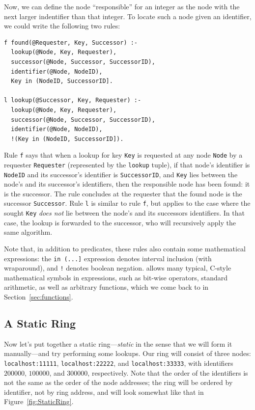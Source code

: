 \documentclass{article}
\begin{document}
Now, we can define the node ``responsible'' for an integer as the node
with the next larger indentifier than that integer.  To locate such a
node given an identifier, we could write the following two rules:
\begin{lstlisting}
f found(@Requester, Key, Successor) :-
  lookup(@Node, Key, Requester),
  successor(@Node, Successor, SuccessorID),
  identifier(@Node, NodeID),
  Key in (NodeID, SuccessorID].

l lookup(@Successor, Key, Requester) :-
  lookup(@Node, Key, Requester),
  successor(@Node, Successor, SuccessorID),
  identifier(@Node, NodeID),
  !(Key in (NodeID, SuccessorID]).
\end{lstlisting}
Rule \lstinline$f$ says that when a lookup for key \lstinline$Key$ is
requested at any node \lstinline$Node$ by a requester
\lstinline$Requester$ (represented by the \lstinline$lookup$ tuple), if
that node's identifier is \lstinline$NodeID$ and its successor's
identifier is \lstinline$SuccessorID$, and \lstinline$Key$ lies between
the node's and its successor's identifiers, then the responsible node
has been found: it is the successor. The rule concludes at the requester
that the found node is the successor \lstinline$Successor$.  Rule
\lstinline$l$ is similar to rule \lstinline$f$, but applies to the case
where the sought \lstinline$Key$ \emph{does not} lie between the node's
and its successors identifiers. In that case, the lookup is forwarded to
the successor, who will recursively apply the same algorithm.

Note that, in addition to predicates, these rules also contain some
mathematical expressions: the \lstinline$in (...]$ expression denotes
interval inclusion (with wraparound), and \lstinline$!$ denotes boolean
negation.  \ol allows many typical, C-style mathematical symbols in
expressions, such as bit-wise operators, standard arithmetic, as well
as arbitrary functions, which we come back to in Section~\ref{sec:functions}.


\subsection{A Static Ring}
\label{sec:staticRing}
Now let's put together a static ring---\emph{static} in the sense that
we will form it manually---and try performing some lookups. Our ring
will consist of three nodes: \lstinline$localhost:11111$,
\lstinline$localhost:22222$, and \lstinline$localhost:33333$, with
identifiers $200000$, $100000$, and $300000$, respectively.  Note that
the order of the identifiers is not the same as the order of the node
addresses; the ring will be ordered by identifier, not by ring address,
and will look somewhat like that in Figure~\ref{fig:StaticRing}.
\end{document}

